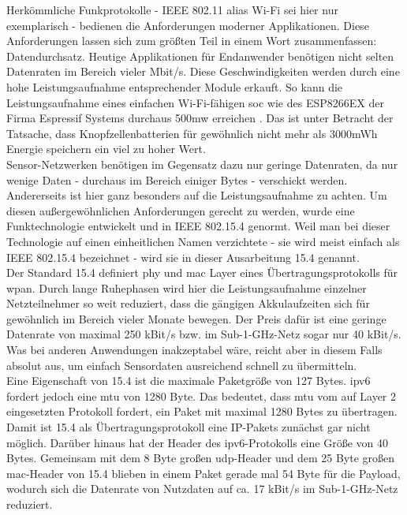 Herkömmliche Funkprotokolle - IEEE 802.11 alias Wi-Fi sei hier nur exemplarisch - bedienen die Anforderungen moderner Applikationen. Diese Anforderungen lassen sich zum größten Teil in einem Wort zusammenfassen: Datendurchsatz. Heutige Applikationen für Endanwender benötigen nicht selten Datenraten im Bereich vieler Mbit/s. Diese Geschwindigkeiten werden durch eine hohe Leistungsaufnahme entsprechender Module erkauft. So kann die Leistungsaufnahme eines einfachen Wi-Fi-fähigen \ac{soc} wie des ESP8266EX der Firma Espressif Systems durchaus 500\ac{m}\ac{w} erreichen \cite{esp8266}. Das ist unter Betracht der Tatsache, dass Knopfzellenbatterien für gewöhnlich nicht mehr als 3000mWh Energie speichern ein viel zu hoher Wert. \\
Sensor-Netzwerken benötigen im Gegensatz dazu nur geringe Datenraten, da nur wenige Daten - durchaus im Bereich einiger Bytes - verschickt werden. Andererseits ist hier ganz besonders auf die Leistungsaufnahme zu achten. Um diesen außergewöhnlichen Anforderungen gerecht zu werden, wurde eine Funktechnologie entwickelt und in IEEE 802.15.4 genormt. Weil man bei dieser Technologie auf einen einheitlichen Namen verzichtete - sie wird meist einfach als IEEE 802.15.4 bezeichnet - wird sie in dieser Ausarbeitung 15.4 genannt. \\
Der Standard 15.4 definiert \ac{phy} und \ac{mac} Layer eines Übertragungsprotokolls für \ac{wpan}. Durch lange Ruhephasen wird hier die Leistungsaufnahme einzelner Netzteilnehmer so weit reduziert, dass die gängigen Akkulaufzeiten sich für gewöhnlich im Bereich vieler Monate bewegen. Der Preis dafür ist eine geringe Datenrate von maximal 250 \ac{k}Bit/s bzw. im Sub-1-GHz-Netz sogar nur 40 \ac{k}Bit/s. Was bei anderen Anwendungen inakzeptabel wäre, reicht aber in diesem Falls absolut aus, um einfach Sensordaten ausreichend schnell zu übermitteln. \\
Eine Eigenschaft von \ac{15.4} ist die maximale Paketgröße von 127 Bytes. \ac{ipv6} fordert jedoch eine \ac{mtu} von 1280 Byte. Das bedeutet, dass \ac{mtu} vom auf Layer 2 eingesetzten Protokoll fordert, ein Paket mit maximal 1280 Bytes zu übertragen. Damit ist \ac{15.4} als Übertragungsprotokoll eine IP-Pakets zunächst gar nicht möglich. Darüber hinaus hat der Header des \ac{ipv6}-Protokolls eine Größe von 40 Bytes. Gemeinsam mit dem 8 Byte großen \ac{udp}-Header und dem 25 Byte großen \ac{mac}-Header von \ac{15.4} blieben in einem Paket gerade mal 54 Byte für die Payload, wodurch sich die Datenrate von Nutzdaten auf ca. 17 \ac{k}Bit/s im Sub-1-GHz-Netz reduziert.\cite{grundlagen6lowpan} \\
